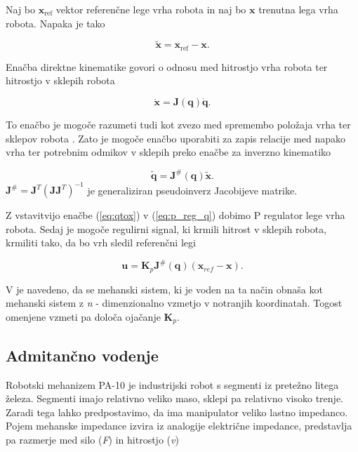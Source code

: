 \documentclass[a4paper]{article}
\begin{document}
Naj bo $\textbf{x}_{\mathrm{ref}}$ vektor referenčne lege vrha robota in naj bo $\textbf{x}$ trenutna lega vrha robota. Napaka je tako

\begin{equation} \label{eq:xerr}
\tilde{\textbf{x}} = \textbf{x}_{\mathrm{ref}}  - \textbf{x}.
\end{equation}

Enačba direktne kinematike govori o odnosu med hitrostjo vrha robota ter hitrostjo v sklepih robota

\begin{equation} \label{eq:qtox}
\dot{\textbf{x}} = \textbf{J}(\textbf{q})  \dot{\textbf{q}}.
\end{equation}

To enačbo je mogoče razumeti tudi kot zvezo med spremembo položaja vrha ter sklepov robota \cite{mihelj_vodenje}. Zato je mogoče enačbo uporabiti za zapis relacije med napako vrha ter potrebnim odmikov v sklepih preko enačbe za inverzno kinematiko

\begin{equation} \label{eq:qerr}
\tilde{\textbf{q}} = \textbf{J}^{\#}(\textbf{q})  \tilde{\textbf{x}}.
\end{equation}
$\mathbf{J}^{\#} =  \mathbf{J}^{T} (\mathbf{J} \mathbf{J}^T)^{-1}$ je generaliziran pseudoinverz Jacobijeve matrike.

Z vstavitvijo enačbe (\ref{eq:qtox}) v (\ref{eq:p_reg_q}) dobimo P regulator lege vrha robota. Sedaj je mogoče regulirni signal, ki krmili hitrost v sklepih robota, krmiliti tako, da bo vrh sledil referenčni legi

\begin{equation} \label{eq:outcontrol}
\textbf{u} = \textbf{K}_p  \textbf{J}^{\#}(\textbf{q})  (\textbf{x}_{ref} - \textbf{x}).
\end{equation}

V \cite{mihelj_vodenje} je navedeno, da se mehanski sistem, ki je voden na ta način obnaša kot mehanski sistem z \textit{n} - dimenzionalno vzmetjo v notranjih koordinatah. Togost omenjene vzmeti pa določa ojačanje $\textbf{K}_p$.


\subsection{Admitančno vodenje} \label{sec:vodenje-admitance}

Robotski mehanizem PA-10 je industrijski robot s segme\-nti iz pretežno litega železa. Segmenti imajo relativno veliko maso, sklepi pa relativno visoko trenje. Zaradi tega lahko predpostavimo, da ima manipulator veliko lastno impedanco. Pojem mehanske impedance izvira iz analogije električne impedance, predstavlja pa razmerje med silo (\textit{F}) in hitrostjo (\textit{v}) 
\end{document}
